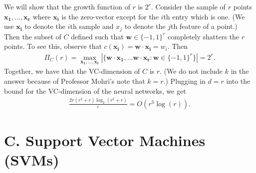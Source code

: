 \begin{enumerate}
    We will show that the growth function of $r$ is $2^r$.
    Consider the sample of $r$ points
    $\boldsymbol{x_1},\ldots,\boldsymbol{x_r}$ where
    $\boldsymbol{x_i}$ is the zero-vector except for the $i$th
    entry which is one.
    (We use $\boldsymbol{x_i}$ to denote the $i$th sample
    and $x_j$ to denote the $j$th feature of a point.)
    Then the subset of $C$ defined such that
    $\boldsymbol{w} \in \{-1,1\}^r$
    completely shatters the $r$ points.
    To see this, observe that
    $c(\boldsymbol{x_i})=\boldsymbol{w} \cdot \boldsymbol{x_i} =w_i$.
    Then
    \begin{align}
        \Pi_C(r) = \max_{\boldsymbol{x_1},\ldots,\boldsymbol{x_r}}
        |\{ \boldsymbol{w} \cdot \boldsymbol{x_1},\ldots
        \boldsymbol{w} \cdot \boldsymbol{x_r}: \boldsymbol{w} \in \{-1,1\}^r
        \}|
        = 2^r.
        \nonumber
    \end{align}
    Together, we have that the VC-dimension of $C$ is $r$.
    (We do not include $k$ in the answer because of Professor
    Mohri's note that $k=r$.)
    Plugging in $d=r$ into the bound for the VC-dimension
    of the neural networks, we get
    \begin{align}
        \frac{2r(r^2 + r)\log_2(r^2+r)}{e}
        = O(r^3\log(r)).
        \nonumber
    \end{align}

\end{enumerate}

\medskip
\section*{C. Support Vector Machines (SVMs)}
\medskip

